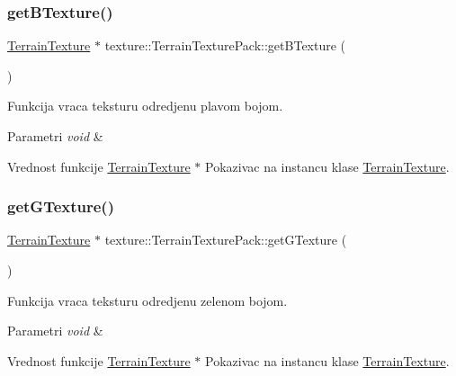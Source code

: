 \subsubsection{\texorpdfstring{get\+B\+Texture()}{getBTexture()}}
{\footnotesize\ttfamily \hyperlink{classtexture_1_1TerrainTexture}{Terrain\+Texture} $\ast$ texture\+::\+Terrain\+Texture\+Pack\+::get\+B\+Texture (\begin{DoxyParamCaption}{ }\end{DoxyParamCaption})}



Funkcija vraca teksturu odredjenu plavom bojom. 


\begin{DoxyParams}{Parametri}
{\em void} & \\
\hline
\end{DoxyParams}
\begin{DoxyReturn}{Vrednost funkcije}
\hyperlink{classtexture_1_1TerrainTexture}{Terrain\+Texture} $\ast$ Pokazivac na instancu klase \hyperlink{classtexture_1_1TerrainTexture}{Terrain\+Texture}. 
\end{DoxyReturn}
\mbox{\label{classtexture_1_1TerrainTexturePack_aeaf5b66e3cb399312e265eab07bcdf3f}} 
\subsubsection{\texorpdfstring{get\+G\+Texture()}{getGTexture()}}
{\footnotesize\ttfamily \hyperlink{classtexture_1_1TerrainTexture}{Terrain\+Texture} $\ast$ texture\+::\+Terrain\+Texture\+Pack\+::get\+G\+Texture (\begin{DoxyParamCaption}{ }\end{DoxyParamCaption})}



Funkcija vraca teksturu odredjenu zelenom bojom. 


\begin{DoxyParams}{Parametri}
{\em void} & \\
\hline
\end{DoxyParams}
\begin{DoxyReturn}{Vrednost funkcije}
\hyperlink{classtexture_1_1TerrainTexture}{Terrain\+Texture} $\ast$ Pokazivac na instancu klase \hyperlink{classtexture_1_1TerrainTexture}{Terrain\+Texture}. 
\end{DoxyReturn}
\mbox{\label{classtexture_1_1TerrainTexturePack_a2e90d77d35768ae2c2c4a640b354fd2e}} 

